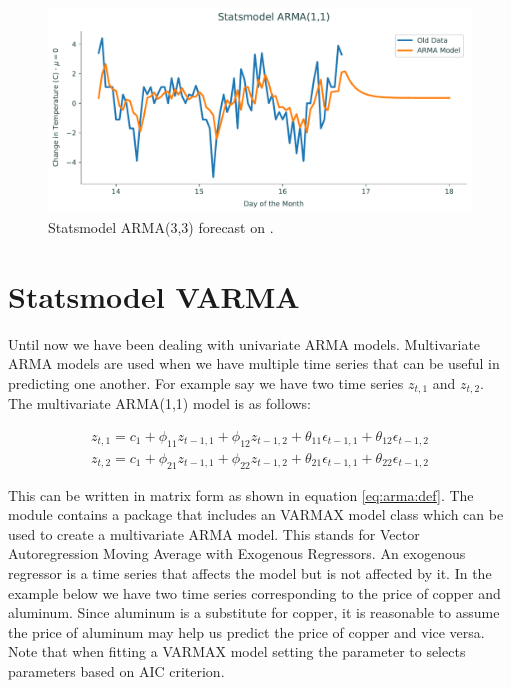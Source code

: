 \begin{figure}[H]
\centering
\includegraphics[width=\textwidth]{figures/sm.pdf}
\caption{Statsmodel ARMA(3,3) forecast on .}
\label{fig:sm}
\end{figure}


\section*{Statsmodel VARMA}
Until now we have been dealing with univariate ARMA models.
Multivariate ARMA models are used when we have multiple time series that can be useful in predicting one another.
For example say we have two time series $z_{t,1}$ and $z_{t,2}$.
The multivariate ARMA(1,1) model is as follows:

\begin{align}
	z_{t,1} = c_1 + \phi_{11} z_{t-1,1} +  \phi_{12} z_{t-1,2} +  \theta_{11} \epsilon_{t-1,1} +  \theta_{12} \epsilon_{t-1,2}
	\\
	z_{t,2} = c_1 + \phi_{21} z_{t-1,1} +  \phi_{22} z_{t-1,2} +  \theta_{21} \epsilon_{t-1,1} +  \theta_{22} \epsilon_{t-1,2}
\end{align}

This can be written in matrix form as shown in equation \ref{eq:arma:def}.
The module  contains a package that includes an VARMAX model class which can be used to create a multivariate ARMA model.
This stands for Vector Autoregression Moving Average with Exogenous Regressors. 
An exogenous regressor is a time series that affects the model but is not affected by it.
In the example below we have two time series corresponding to the price of copper and aluminum. 
Since aluminum is a substitute for copper, it is reasonable to assume the price of aluminum may help us predict the price of copper and vice versa.
Note that when fitting a VARMAX model setting the parameter  to  selects parameters based on AIC criterion. 

